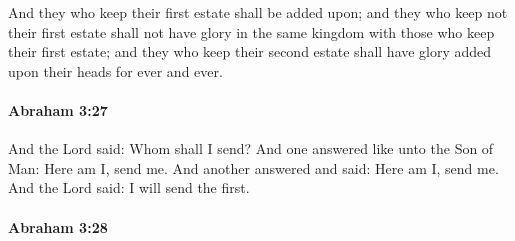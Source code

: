 			And they who keep their first estate shall be added upon; and they who keep not their first estate shall not have glory in the same kingdom with those who keep their first estate; and they who keep their second estate shall have glory added upon their heads for ever and ever.


		\paragraph{Abraham 3:27} %
			\label{ABRAHAM-3-27}

			And the Lord said: Whom shall I send?  And one answered like unto the Son of Man: Here am I, send me.  And another answered and said: Here am I, send me.  And the Lord said: I will send the first.


		\paragraph{Abraham 3:28} %
			\label{ABRAHAM-3-28}

